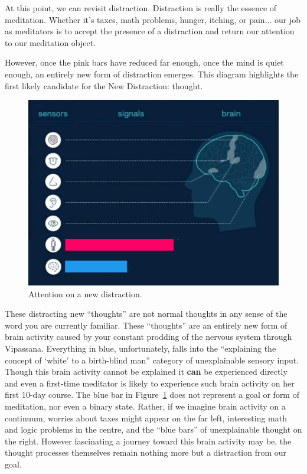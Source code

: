 \documentclass{article}
\begin{document}
At this point, we can revisit distraction. Distraction is really the essence of meditation. Whether it's taxes, math problems, hunger, itching, or pain... our job as meditators is to accept the presence of a distraction and return our attention to our meditation object.

However, once the pink bars have reduced far enough, once the mind is quiet enough, an entirely new form of distraction emerges. This diagram highlights the first likely candidate for the New Distraction: thought.

\begin{figure}[h]
  \centering
  \includegraphics[width=\linewidth]{images/ma-vipassana3.png}
  \caption{Attention on a new distraction.}
  \label{fig:vipassana-sense-map-2}
\end{figure}

These distracting new ``thoughts'' are not normal thoughts in any sense of the word you are currently familiar. These ``thoughts'' are an entirely new form of brain activity caused by your constant prodding of the nervous system through Vipassana. Everything in blue, unfortunately, falls into the ``explaining the concept of `white' to a birth-blind man'' category of unexplainable sensory input. Though this brain activity cannot be explained it \textbf{can} be experienced directly and even a first-time meditator is likely to experience such brain activity on her first 10-day course. The blue bar in Figure~\ref{fig:vipassana-sense-map-2} does not represent a goal or form of meditation, nor even a binary state. Rather, if we imagine brain activity on a continuum, worries about taxes might appear on the far left, interesting math and logic problems in the centre, and the ``blue bars'' of unexplainable thought on the right. However fascinating a journey toward this brain activity may be, the thought processes themselves remain nothing more but a distraction from our goal.
\end{document}
